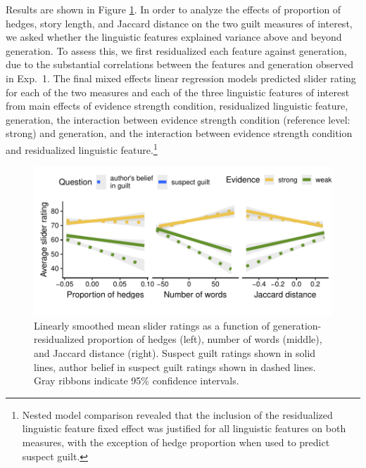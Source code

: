 \documentclass[10pt,letterpaper]{article}
\begin{document}
Results are shown in Figure \ref{fig:lingmarkers}. In order to analyze the effects of proportion of hedges, story length, and Jaccard distance on the two guilt measures of interest, we asked whether the linguistic features explained variance above and beyond generation. To assess this, we first residualized each feature against generation, due to the substantial correlations between the features and generation observed in Exp.~1. The final mixed effects linear regression models predicted slider rating for each of the two measures and each of the three linguistic features of interest from main effects of evidence strength condition, residualized linguistic feature, generation, the interaction between evidence strength condition (reference level: strong) and generation, and the interaction between evidence strength condition and residualized linguistic feature.\footnote{Nested model comparison revealed that the inclusion of the residualized linguistic feature fixed effect was justified for all linguistic features on both measures, with the exception of hedge proportion when used to predict suspect guilt.}


\begin{figure}[]
	\centering
	\includegraphics[width=.5\textwidth]{pics/lingmarkers_resid}
	\caption{Linearly smoothed mean slider ratings as a function of generation-residualized proportion of hedges (left), number of words (middle), and Jaccard distance (right). Suspect guilt ratings shown in solid lines, author belief in suspect guilt ratings shown in dashed lines. Gray ribbons indicate 95\% confidence intervals.} 
	\label{fig:lingmarkers}
\end{figure}
\end{document}
